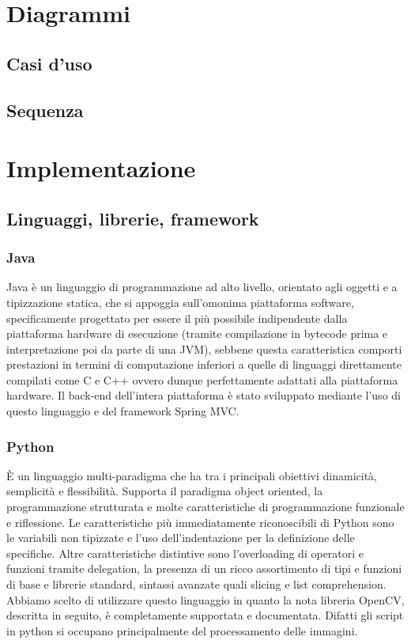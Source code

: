 \documentclass[twoside]{supsistudent}
\begin{document}
\chapter{Diagrammi}

\section{Casi d'uso}

\section{Sequenza}

\chapter{Implementazione}

\section{Linguaggi, librerie, framework}
\subsection{Java}
Java è un linguaggio di programmazione ad alto livello, orientato agli 
oggetti e a tipizzazione statica, che si appoggia sull'omonima piattaforma software, 
specificamente progettato per essere il più possibile indipendente dalla piattaforma 
hardware di esecuzione (tramite compilazione in bytecode prima e interpretazione poi 
da parte di una JVM), sebbene questa caratteristica comporti prestazioni in termini 
di computazione inferiori a quelle di linguaggi direttamente compilati come C e C++ 
ovvero dunque perfettamente adattati alla piattaforma hardware.
Il back-end dell'intera piattaforma è stato sviluppato mediante l'uso di questo linguaggio e 
del framework Spring MVC.
\subsection{Python}
È un linguaggio multi-paradigma che ha tra i principali obiettivi dinamicità, semplicità
e flessibilità. Supporta il paradigma object oriented, la programmazione strutturata e 
molte caratteristiche di programmazione funzionale e riflessione. Le caratteristiche più 
immediatamente riconoscibili di Python sono le variabili non tipizzate e l'uso 
dell'indentazione per la definizione delle specifiche. Altre caratteristiche distintive 
sono l'overloading di operatori e funzioni tramite delegation, la presenza di un 
ricco assortimento di tipi e funzioni di base e librerie standard, sintassi avanzate 
quali slicing e list comprehension.
Abbiamo scelto di utilizzare questo linguaggio in quanto la nota libreria OpenCV, descritta in 
seguito, è completamente supportata e documentata. Difatti gli script in python si occupano 
principalmente del processamento delle immagini. 
\end{document}

